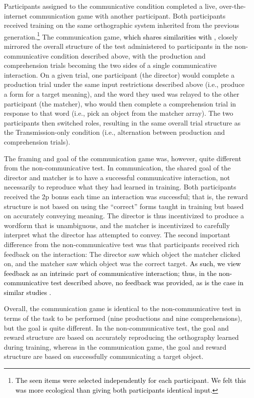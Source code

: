 \documentclass[doc,biblatex]{apa7}
\newcommand\newmaterial[1]{\textcolor{black}{#1}}
\begin{document}
Participants assigned to the communicative condition completed a live, over-the-internet communication game with another participant. Both participants received training on the same orthographic system inherited from the previous generation.\footnote{\newmaterial{The seen items were selected independently for each participant. We felt this was more ecological than giving both participants identical input.}} The communication game, \newmaterial{which shares similarities with \textcite{Kirby:2015},} closely mirrored the overall structure of the test administered to participants in the non-communicative condition described above, with the production and comprehension trials becoming the two sides of a single communicative interaction. On a given trial, one participant (the director) would complete a production trial under the same input restrictions described above (i.e., produce a form for a target meaning), and the word they used was relayed to the other participant (the matcher), who would then complete a comprehension trial in response to that word (i.e., pick an object from the matcher array). The two participants then switched roles, resulting in the same overall trial structure as the Transmission-only condition (i.e., alternation between production and comprehension trials).

The framing and goal of the communication game was, however, quite different from the non-communicative test. In communication, the shared goal of the director and matcher is to have a successful communicative interaction, not necessarily to reproduce what they had learned in training. Both participants received the 2p bonus each time an interaction was successful; that is, the reward structure is not based on using the ``correct'' forms taught in training but based on accurately conveying meaning. The director is thus incentivized to produce a wordform that is unambiguous, and the matcher is incentivized to carefully interpret what the director has attempted to convey. The second important difference from the non-communicative test was that participants received rich feedback on the interaction: The director saw which object the matcher clicked on, and the matcher saw which object was the correct target. \newmaterial{As such, we view feedback as an intrinsic part of communicative interaction; thus, in the non-communicative test described above, no feedback was provided, as is the case in similar studies \parencite{Carr:2017, Motamedi:2019, Saldana:2019, Silvey:2019}.}

Overall, the communication game is identical to the non-communicative test in terms of the task to be performed (nine productions and nine comprehensions), but the goal is quite different. In the non-communicative test, the goal and reward structure are based on accurately reproducing the orthography learned during training, whereas in the communication game, the goal and reward structure are based on successfully communicating a target object.
\end{document}
